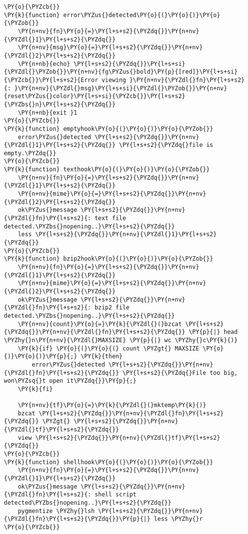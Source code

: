 \begin{Verbatim}[commandchars=\\\{\}]
\PY{o}{\PYZcb{}}
\PY{k}{function} error\PYZus{}detected\PY{o}{(}\PY{o}{)}\PY{o}{\PYZob{}}
    \PY{n+nv}{fn}\PY{o}{=}\PY{l+s+s2}{\PYZdq{}}\PY{n+nv}{\PYZdl{}1}\PY{l+s+s2}{\PYZdq{}}
    \PY{n+nv}{msg}\PY{o}{=}\PY{l+s+s2}{\PYZdq{}}\PY{n+nv}{\PYZdl{}2}\PY{l+s+s2}{\PYZdq{}}
    \PY{n+nb}{echo} \PY{l+s+s2}{\PYZdq{}}\PY{l+s+si}{\PYZdl{}\PYZob{}}\PY{n+nv}{fg\PYZus{}bold}\PY{p}{[red]}\PY{l+s+si}{\PYZcb{}}\PY{l+s+s2}{Error viewing }\PY{n+nv}{\PYZdl{}fn}\PY{l+s+s2}{: }\PY{n+nv}{\PYZdl{}msg}\PY{l+s+si}{\PYZdl{}\PYZob{}}\PY{n+nv}{reset\PYZus{}color}\PY{l+s+si}{\PYZcb{}}\PY{l+s+s2}{\PYZbs{}n}\PY{l+s+s2}{\PYZdq{}}
    \PY{n+nb}{exit }1
\PY{o}{\PYZcb{}}
\PY{k}{function} emptyhook\PY{o}{(}\PY{o}{)}\PY{o}{\PYZob{}}
    error\PYZus{}detected \PY{l+s+s2}{\PYZdq{}}\PY{n+nv}{\PYZdl{}1}\PY{l+s+s2}{\PYZdq{}} \PY{l+s+s2}{\PYZdq{}file is empty.\PYZdq{}}
\PY{o}{\PYZcb{}}
\PY{k}{function} texthook\PY{o}{(}\PY{o}{)}\PY{o}{\PYZob{}}
    \PY{n+nv}{fn}\PY{o}{=}\PY{l+s+s2}{\PYZdq{}}\PY{n+nv}{\PYZdl{}1}\PY{l+s+s2}{\PYZdq{}}
    \PY{n+nv}{mime}\PY{o}{=}\PY{l+s+s2}{\PYZdq{}}\PY{n+nv}{\PYZdl{}2}\PY{l+s+s2}{\PYZdq{}}
    ok\PYZus{}message \PY{l+s+s2}{\PYZdq{}}\PY{n+nv}{\PYZdl{}fn}\PY{l+s+s2}{: text file detected.\PYZbs{}nopening..}\PY{l+s+s2}{\PYZdq{}}
    less \PY{l+s+s2}{\PYZdq{}}\PY{n+nv}{\PYZdl{}1}\PY{l+s+s2}{\PYZdq{}}
\PY{o}{\PYZcb{}}
\PY{k}{function} bzip2hook\PY{o}{(}\PY{o}{)}\PY{o}{\PYZob{}}
    \PY{n+nv}{fn}\PY{o}{=}\PY{l+s+s2}{\PYZdq{}}\PY{n+nv}{\PYZdl{}1}\PY{l+s+s2}{\PYZdq{}}
    \PY{n+nv}{mime}\PY{o}{=}\PY{l+s+s2}{\PYZdq{}}\PY{n+nv}{\PYZdl{}2}\PY{l+s+s2}{\PYZdq{}}
    ok\PYZus{}message \PY{l+s+s2}{\PYZdq{}}\PY{n+nv}{\PYZdl{}fn}\PY{l+s+s2}{: bzip2 file detected.\PYZbs{}nopening..}\PY{l+s+s2}{\PYZdq{}}
    \PY{n+nv}{count}\PY{o}{=}\PY{k}{\PYZdl{}(}bzcat \PY{l+s+s2}{\PYZdq{}}\PY{n+nv}{\PYZdl{}fn}\PY{l+s+s2}{\PYZdq{}} \PY{p}{|} head \PYZhy{}n\PY{n+nv}{\PYZdl{}MAXSIZE} \PY{p}{|} wc \PYZhy{}c\PY{k}{)}
    \PY{k}{if} \PY{o}{(}\PY{o}{(} count \PYZgt{} MAXSIZE \PY{o}{)}\PY{o}{)}\PY{p}{;} \PY{k}{then}
		error\PYZus{}detected \PY{l+s+s2}{\PYZdq{}}\PY{n+nv}{\PYZdl{}fn}\PY{l+s+s2}{\PYZdq{}} \PY{l+s+s2}{\PYZdq{}File too big, won\PYZsq{}t open it\PYZdq{}}\PY{p}{;}
    \PY{k}{fi}

    \PY{n+nv}{tf}\PY{o}{=}\PY{k}{\PYZdl{}(}mktemp\PY{k}{)}
    bzcat \PY{l+s+s2}{\PYZdq{}}\PY{n+nv}{\PYZdl{}fn}\PY{l+s+s2}{\PYZdq{}} \PYZgt{} \PY{l+s+s2}{\PYZdq{}}\PY{n+nv}{\PYZdl{}tf}\PY{l+s+s2}{\PYZdq{}}
    view \PY{l+s+s2}{\PYZdq{}}\PY{n+nv}{\PYZdl{}tf}\PY{l+s+s2}{\PYZdq{}}
\PY{o}{\PYZcb{}}
\PY{k}{function} shellhook\PY{o}{(}\PY{o}{)}\PY{o}{\PYZob{}}
    \PY{n+nv}{fn}\PY{o}{=}\PY{l+s+s2}{\PYZdq{}}\PY{n+nv}{\PYZdl{}1}\PY{l+s+s2}{\PYZdq{}}
    ok\PYZus{}message \PY{l+s+s2}{\PYZdq{}}\PY{n+nv}{\PYZdl{}fn}\PY{l+s+s2}{: shell script detected\PYZbs{}nopening..}\PY{l+s+s2}{\PYZdq{}}
    pygmentize \PYZhy{}lsh \PY{l+s+s2}{\PYZdq{}}\PY{n+nv}{\PYZdl{}fn}\PY{l+s+s2}{\PYZdq{}}\PY{p}{|} less \PYZhy{}r
\PY{o}{\PYZcb{}}



\end{Verbatim}
